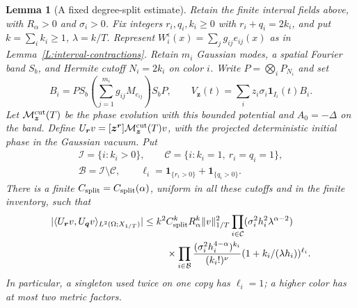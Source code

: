 \documentclass[12pt]{article}
\numberwithin{equation}{section}
\newtheorem{lemma}[theorem]{Lemma}
\theoremstyle{definition}
\begin{document}
\begin{lemma}[A fixed degree-split estimate]\label{L:fixed-split}
  Retain the finite interval fields above, with $R_\alpha>0$ and
  $\sigma_i>0$. Fix integers $r_i,q_i,k_i\ge0$ with
  $r_i+q_i=2k_i$, and put $k=\sum_i k_i\ge1$, $\lambda=k/T$.
  Represent $W_i^\epsilon(x)=\sum_jg_{ij}e_{ij}(x)$ as in
  Lemma~\ref{L:interval-contractions}. Retain $m_i$ Gaussian modes,
  a spatial Fourier band $S_b$, and Hermite cutoff $N_i=2k_i$ on
  color $i$. Write $P=\bigotimes_iP_{N_i}$
  and set
  \[
    B_i=P S_b\left(\sum_{j=1}^{m_i}g_{ij}M_{e_{ij}}\right)S_bP,
    \qquad V_{\boldsymbol z}(t)
    =\sum_i z_i\sigma_i\mathbf1_{I_i}(t)B_i.
  \]
  Let $\mathcal M^{\rm cut}_{\boldsymbol z}(T)$ be the phase evolution
  with this bounded potential and $A_0=-\Delta$ on the band. Define
  $U_{\boldsymbol r}v=[\boldsymbol z^{\boldsymbol r}]
  \mathcal M^{\rm cut}_{\boldsymbol z}(T)v$, with the projected
  deterministic initial phase in the Gaussian vacuum. Put
  \[
    \begin{gathered}
      \mathcal I=\{i:k_i>0\},\qquad
      \mathcal C=\{i:k_i=1,\ r_i=q_i=1\},\\
      \mathcal B=\mathcal I\setminus\mathcal C,\qquad
      \ell_i=\mathbf1_{\{r_i>0\}}+\mathbf1_{\{q_i>0\}}.
    \end{gathered}
  \]
  There is a finite $C_{\rm split}=C_{\rm split}(\alpha)$, uniform
  in all these cutoffs and in the finite inventory, such that
  \begin{equation}\label{E:fixed-split-bound}
    \begin{split}
      |\langle U_{\boldsymbol r}v,U_{\boldsymbol q}v
      \rangle_{L^2(\Omega;X_{1/T})}|
      \le{}&k^2 C_{\rm split}^k R_\alpha^k\|v\|_{1/T}^2
      \prod_{i\in\mathcal C}
      (\sigma_i^2h_i^2\lambda^{\alpha-2})\\
      &\quad\times\prod_{i\in\mathcal B}
      \frac{(\sigma_i^2h_i^{4-\alpha})^{k_i}}{(k_i!)^\nu}
      (1+k_i/(\lambda h_i))^{\ell_i}.
    \end{split}
  \end{equation}
  In particular, a singleton used twice on one copy has $\ell_i=1$;
  a higher color has at most two metric factors.
\end{lemma}
\end{document}
